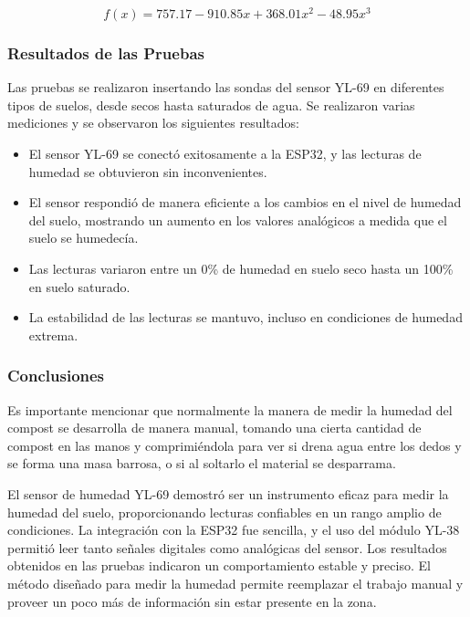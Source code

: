 \begin{equation}
f(x) = 757.17 - 910.85x + 368.01x^2 - 48.95x^3
\end{equation}


\subsubsection{Resultados de las Pruebas}
Las pruebas se realizaron insertando las sondas del sensor YL-69 en diferentes tipos de suelos, desde secos hasta saturados de agua. Se realizaron varias mediciones y se observaron los siguientes resultados:

\begin{itemize}
    \item El sensor YL-69 se conectó exitosamente a la ESP32, y las lecturas de humedad se obtuvieron sin inconvenientes.
    \item El sensor respondió de manera eficiente a los cambios en el nivel de humedad del suelo, mostrando un aumento en los valores analógicos a medida que el suelo se humedecía.
    \item Las lecturas variaron entre un 0\% de humedad en suelo seco hasta un 100\% en suelo saturado.
    \item La estabilidad de las lecturas se mantuvo, incluso en condiciones de humedad extrema.
\end{itemize}

\subsubsection{Conclusiones}
Es importante mencionar que normalmente la manera de medir la humedad del compost se desarrolla de manera manual, tomando una cierta cantidad de compost en las manos y comprimiéndola para ver si drena agua entre los dedos y se forma una masa barrosa, o si al soltarlo el material se desparrama.

El sensor de humedad YL-69 demostró ser un instrumento eficaz para medir la humedad del suelo, proporcionando lecturas confiables en un rango amplio de condiciones. La integración con la ESP32 fue sencilla, y el uso del módulo YL-38 permitió leer tanto señales digitales como analógicas del sensor. Los resultados obtenidos en las pruebas indicaron un comportamiento estable y preciso. El método diseñado para medir la humedad permite reemplazar el trabajo manual y proveer un poco más de información sin estar presente en la zona.



